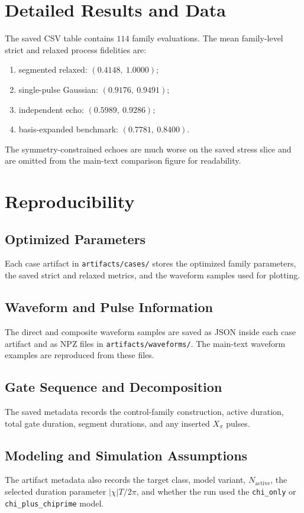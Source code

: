 \documentclass[aps,pra,twocolumn,reprint,floatfix,amsmath,amssymb]{revtex4-2}
\begin{document}
\appendix

\section{Detailed Results and Data}
The saved CSV table contains $114$ family evaluations.  The mean family-level strict and relaxed process fidelities are:
\begin{enumerate}
\item segmented relaxed: $(0.4148,\ 1.0000)$;
\item single-pulse Gaussian: $(0.9176,\ 0.9491)$;
\item independent echo: $(0.5989,\ 0.9286)$;
\item basis-expanded benchmark: $(0.7781,\ 0.8400)$.
\end{enumerate}
The symmetry-constrained echoes are much worse on the saved stress slice and are omitted from the main-text comparison figure for readability.

\section{Reproducibility}
\subsection{Optimized Parameters}
Each case artifact in \texttt{artifacts/cases/} stores the optimized family parameters, the saved strict and relaxed metrics, and the waveform samples used for plotting.

\subsection{Waveform and Pulse Information}
The direct and composite waveform samples are saved as JSON inside each case artifact and as NPZ files in \texttt{artifacts/waveforms/}.  The main-text waveform examples are reproduced from these files.

\subsection{Gate Sequence and Decomposition}
The saved metadata records the control-family construction, active duration, total gate duration, segment durations, and any inserted $X_\pi$ pulses.

\subsection{Modeling and Simulation Assumptions}
The artifact metadata also records the target class, model variant, $N_{\mathrm{active}}$, the selected duration parameter $|\chi|T/2\pi$, and whether the run used the \texttt{chi\_only} or \texttt{chi\_plus\_chiprime} model.
\end{document}
